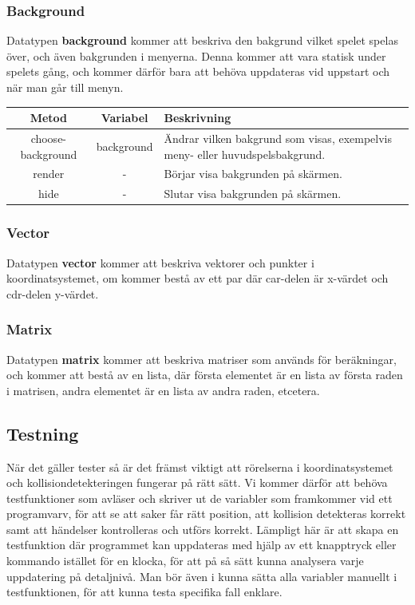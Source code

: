 \documentclass[12pt,a4paper]{article}
\begin{document}
\subsubsection{Background}
Datatypen \textbf{background} kommer att beskriva den bakgrund vilket spelet spelas över, och även bakgrunden i menyerna. Denna kommer att vara statisk under spelets gång, och kommer därför bara att behöva uppdateras vid uppstart och när man går till menyn.

\vspace{0.2cm}

\begin{tabular}{| c | c | p{7cm} |}
	\hline
	\textbf{Metod} & \textbf{Variabel} & \textbf{Beskrivning} \\
	\hline
	
	choose-background & background & Ändrar vilken bakgrund som visas, exempelvis meny- eller huvudspelsbakgrund.\\
	\hline
	render & - & Börjar visa bakgrunden på skärmen. \\
	\hline
	hide & - & Slutar visa bakgrunden på skärmen. \\
	\hline
\end{tabular}

\subsubsection{Vector}
Datatypen \textbf{vector} kommer att beskriva vektorer och punkter i koordinatsystemet, om kommer bestå av ett par där car-delen är x-värdet och cdr-delen y-värdet.

\subsubsection{Matrix}
Datatypen \textbf{matrix} kommer att beskriva matriser som används för beräkningar, och kommer att bestå av en lista, där första elementet är en lista av första raden i matrisen, andra elementet är en lista av andra raden, etcetera.


\subsection{Testning}
När det gäller tester så är det främst viktigt att rörelserna i koordinatsystemet och kollisiondetekteringen fungerar på rätt sätt. Vi kommer därför att behöva testfunktioner som avläser och skriver ut de variabler som framkommer vid ett programvarv, för att se att saker får rätt position, att kollision detekteras korrekt samt att händelser kontrolleras och utförs korrekt. Lämpligt här är att skapa en testfunktion där programmet kan uppdateras med hjälp av ett knapptryck eller kommando istället för en klocka, för att på så sätt kunna analysera varje uppdatering på detaljnivå. Man bör även i kunna sätta alla variabler manuellt i testfunktionen, för att kunna testa specifika fall enklare. \\
\end{document}
